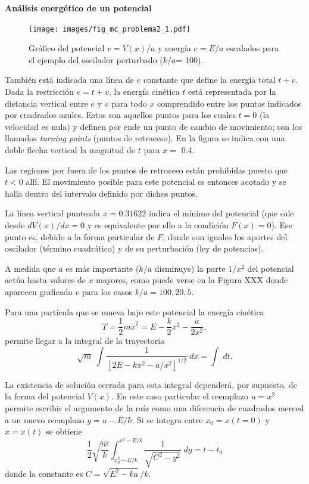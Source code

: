 \documentclass[10pt,oneside]{CBFT_book}
\begin{document}
\begin{ejemplo}{\bfseries Análisis energético de un potencial }
\begin{figure}[!ht]
	\begin{center}
	\texttt{[image: images/fig\_mc\_problema2\_1.pdf]}	
	\end{center}
	\vspace*{-5mm}
	\caption{Gráfico del potencial $v=V(x)/a$ y energía $e=E/a$ escalados para el ejemplo del oscilador perturbado 
	($ k/a $= 100).}
	\label{fig_mc_problema2_1}
\end{figure} 

También está indicada una línea de $ e $ constante que define la energía total $t + v$. Dada la restricción $ e = t + 
v$, la energía cinética $t$ está representada por la distancia vertical entre $e$ y $v$ para todo $x$ comprendido entre 
los puntos indicados por cuadrados azules. Estos son aquellos puntos para los cuales $t=0$ (la velocidad es nula) y 
definen por ende un punto de cambio de movimiento; son los llamados {\it turning points} (puntos de retroceso). 
En la figura se indica con una doble flecha vertical la magnitud de $t$ para $x =$ 0.4.

Las regiones por fuera de los puntos de retroceso están prohibidas puesto que $ t < 0 $ allí.
El movimiento posible para este potencial es entonces acotado y se halla dentro del intervalo definido por dichos 
puntos.

La línea vertical punteada $x=0.31622$ indica el mínimo del potencial (que sale desde $ dV(x)/dx = 0 $ y es 
equivalente por ello a la condición $ F(x)= 0 $). Ese punto es, debido a la forma particular de $F$, donde son iguales 
los aportes del oscilador (término cuadrático) y de su perturbación (ley de potencias).

A medida que $ a $ es más importante ($k/a$ disminuye) la parte $ 1 / x^2 $ del potencial actúa hasta valores de $ x $ 
mayores, como puede verse en la Figura XXX donde aparecen graficado $v$ para los casos $ k/a = 100, 20, 5 $.


Para una partícula que se mueva bajo este potencial la energía cinética
\[
	T = \frac{1}{2} m \dot{x}^2 = E - \frac{k}{2} x^2 - \frac{a}{2 x^2},
\]
permite llegar a la integral de la trayectoria
\[
	\sqrt{m} \: \int \frac{1}{ \left[ 2E - kx^2 - a/x^2 \right]^{1/2} } \: dx = \int \; dt.
\]

La existencia de solución cerrada para esta integral dependerá, por supuesto, de la forma del potencial $V(x)$.
En este caso particular el reemplazo $ u = x^2 $ permite escribir el argumento de la raíz como una diferencia de
cuadrados merced a un nuevo reemplazo $ y = u - E/k $. 
Si se integra entre $ x_0 = x(t=0) $ y $ x = x(t) $ se obtiene 
\[
	\frac{1}{2}\sqrt{\frac{m}{k}} \int_{x_0^2 - E/k}^{{x^2 - E/k}} \frac{1}{\sqrt{C^2 - y^2}} \; dy = t - t_0
\]
donde la constante es $ C = \sqrt{E^2 - ka}/k $.


\end{ejemplo}
\end{document}
